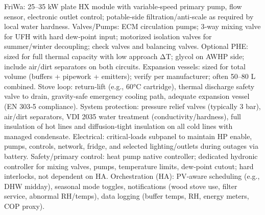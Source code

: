 \markdownRendererUlItem FriWa: 25–35 kW plate HX module with variable‑speed primary pump, flow sensor, electronic outlet control; potable‑side filtration/anti‑scale as required by local water hardness.\markdownRendererUlItemEnd 
\markdownRendererUlItem Valves/Pumps: ECM circulation pumps; 3‑way mixing valve for UFH with hard dew‑point input; motorized isolation valves for summer/winter decoupling; check valves and balancing valves.\markdownRendererUlItemEnd 
\markdownRendererUlItem Optional PHE: sized for full thermal capacity with low approach ΔT; glycol on AWHP side; include air/dirt separators on both circuits.\markdownRendererUlItemEnd 
\markdownRendererUlItem Expansion vessels: sized for total volume (buffers + pipework + emitters); verify per manufacturer; often 50–80 L combined.\markdownRendererUlItemEnd 
\markdownRendererUlEndTight \markdownRendererInterblockSeparator
{}
\markdownRendererSectionEnd \markdownRendererSectionBegin
{}\markdownRendererInterblockSeparator
{}\markdownRendererUlBeginTight
\markdownRendererUlItem Stove loop: return‑lift (e.g., 60°C cartridge), thermal discharge safety valve to drain, gravity‑safe emergency cooling path, adequate expansion vessel (EN 303‑5 compliance).\markdownRendererUlItemEnd 
\markdownRendererUlItem System protection: pressure relief valves (typically 3 bar), air/dirt separators, VDI 2035 water treatment (conductivity/hardness), full insulation of hot lines and diffusion‑tight insulation on all cold lines with managed condensate.\markdownRendererUlItemEnd 
\markdownRendererUlItem Electrical: critical‑loads subpanel to maintain HP enable, pumps, controls, network, fridge, and selected lighting/outlets during outages via battery.\markdownRendererUlItemEnd 
\markdownRendererUlEndTight \markdownRendererInterblockSeparator
{}
\markdownRendererSectionEnd \markdownRendererSectionBegin
{}\markdownRendererInterblockSeparator
{}\markdownRendererUlBeginTight
\markdownRendererUlItem Safety/primary control: heat pump native controller; dedicated hydronic controller for mixing valves, pumps, temperature limits, dew‑point cutout; hard interlocks, not dependent on HA.\markdownRendererUlItemEnd 
\markdownRendererUlItem Orchestration (HA): PV‑aware scheduling (e.g., DHW midday), seasonal mode toggles, notifications (wood stove use, filter service, abnormal RH/temps), data logging (buffer temps, RH, energy meters, COP proxy).\markdownRendererUlItemEnd 
\markdownRendererUlEndTight 
\markdownRendererSectionEnd 
\markdownRendererSectionEnd \markdownRendererDocumentEnd